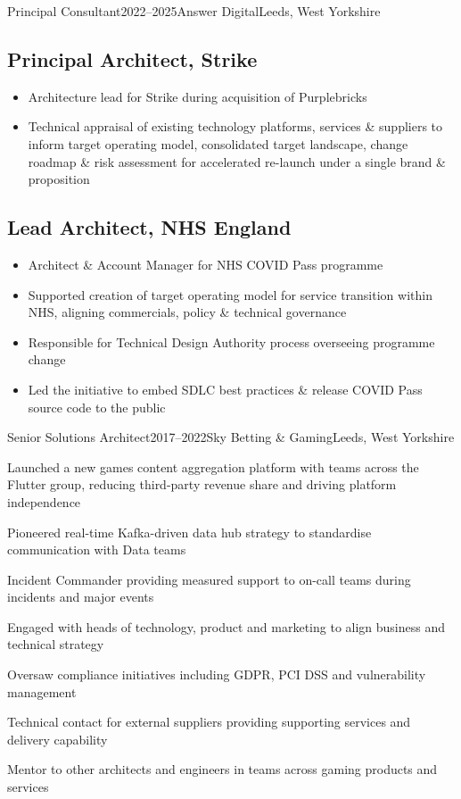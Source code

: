 \documentclass{cv}
\begin{document}
\begin{experienceplain}{Principal Consultant}{2022--2025}{Answer Digital}{Leeds, West Yorkshire}
\subsection{Principal Architect, Strike}
\begin{itemize}
\item Architecture lead for Strike during acquisition of Purplebricks
\item Technical appraisal of existing technology platforms, services \& suppliers to inform target
      operating model, consolidated target landscape, change roadmap \& risk assessment for
      accelerated re-launch under a single brand \& proposition
\end{itemize}

\subsection{Lead Architect, NHS England}
\begin{itemize}
\item Architect \& Account Manager for NHS COVID Pass programme
\item Supported creation of target operating model for service transition within NHS, aligning
      commercials, policy \& technical governance
\item Responsible for Technical Design Authority process overseeing programme change
\item Led the initiative to embed SDLC best practices \& release COVID Pass source code to
      the public
\end{itemize}
\end{experienceplain}


\begin{experience}{Senior Solutions Architect}{2017--2022}{Sky Betting \& Gaming}{Leeds, West Yorkshire}
\item Launched a new games content aggregation platform with teams across the Flutter group, reducing
      third-party revenue share and driving platform independence
\item Pioneered real-time Kafka-driven data hub strategy to standardise communication with Data teams
\item Incident Commander providing measured support to on-call teams during incidents and major events
\item Engaged with heads of technology, product and marketing to align business and technical strategy
\item Oversaw compliance initiatives including GDPR, PCI DSS and vulnerability management
\item Technical contact for external suppliers providing supporting services and delivery capability
\item Mentor to other architects and engineers in teams across gaming products and services
\end{experience}
\end{document}

